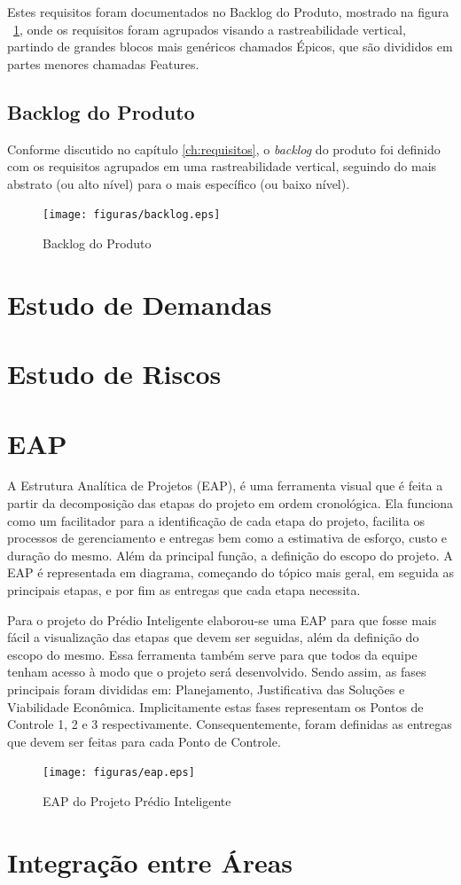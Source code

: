 Estes requisitos foram documentados no Backlog do Produto, mostrado na figura ~\ref{fig:backlog}, onde os requisitos foram agrupados visando a rastreabilidade vertical, partindo de grandes blocos mais genéricos chamados Épicos, que são divididos em partes menores chamadas Features.

\section{Backlog do Produto}
Conforme discutido no capítulo \ref{ch:requisitos}, o \textit{backlog} do produto foi definido com os requisitos agrupados em uma rastreabilidade vertical, seguindo do mais abstrato (ou alto nível) para o mais específico (ou baixo nível).

\begin{figure}[!h]
  \centering
  	\texttt{[image: figuras/backlog.eps]}
   \caption{Backlog do Produto\label{fig:backlog}}
\end{figure}

\chapter{Estudo de Demandas}

\chapter{Estudo de Riscos}

\chapter{EAP}
A Estrutura Analítica de Projetos (EAP), é uma ferramenta visual que é feita a partir da decomposição das etapas do projeto em ordem cronológica. Ela funciona como um facilitador para a identificação de cada etapa do projeto, facilita os processos de gerenciamento e entregas bem como a estimativa de esforço, custo e duração do mesmo. Além da principal função, a definição do escopo do projeto. A EAP é representada em diagrama, começando do tópico mais geral, em seguida as principais etapas, e por fim as entregas que cada etapa necessita.

Para o projeto do Prédio Inteligente elaborou-se uma EAP para que fosse mais fácil a visualização das etapas que devem ser seguidas, além da definição do escopo do mesmo. Essa ferramenta também serve para que todos da equipe tenham acesso à modo que o projeto será desenvolvido. Sendo assim, as fases principais foram divididas em: Planejamento, Justificativa das Soluções e Viabilidade Econômica. Implicitamente estas fases representam os Pontos de Controle 1, 2 e 3 respectivamente. Consequentemente, foram definidas as entregas que devem ser feitas para cada Ponto de Controle.
 \begin{figure}[!h]
 	\centering
 	\texttt{[image: figuras/eap.eps]}
 	\caption{EAP do Projeto Prédio Inteligente}
 	\label{fig01}
 \end{figure}

\chapter{Integração entre Áreas}
